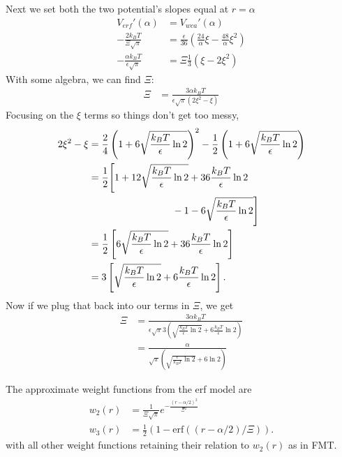 \documentclass[letterpaper,twocolumn,amsmath,amssymb,prb]{revtex4-1}
\begin{document}
Next we set both the two potential's slopes equal at $r = \alpha$
\begin{align}
  V_{erf}'(\alpha) &= V_{wca}'(\alpha) \\
  -\frac{2 k_B T}{\Xi \sqrt{\pi}} &= \frac{\epsilon}{36} \left(
  \frac{24}{\alpha} \xi - \frac{48}{\alpha} \xi^2 \right) \\
  -\frac{\alpha k_B T}{\epsilon \sqrt{\pi}} &= \Xi \frac{1}{3} \left(
  \xi - 2\xi^2 \right)
\end{align}
With some algebra, we can find $\Xi$:
\begin{align}
  \Xi &= \frac{3 \alpha k_B T}{\epsilon \sqrt{\pi} \left( 2 \xi^2 - \xi
    \right)}
\end{align}
Focusing on the $\xi$ terms so things don't get too messy,
\begin{align}
  2 \xi^2 - \xi &=  \frac{2}{4}\left(1 +
  6\sqrt{ \frac{k_BT}{\epsilon} \ln 2} \right)^2
  - \frac{1}{2}\left(1 +
  6\sqrt{ \frac{k_BT}{\epsilon} \ln 2} \right) \\
  &= \frac{1}{2}\Bigg[ 1 + 12\sqrt{ \frac{k_BT}{\epsilon}\ln 2} + 36
    \frac{k_BT}{\epsilon}\ln 2 \notag \\
    &\hspace{3cm}-1 - 6\sqrt{ \frac{k_BT}{\epsilon} \ln 2} \Bigg] \\
  &=\frac{1}{2}\left[ 6 \sqrt{ \frac{k_BT}{\epsilon} \ln 2} + 36
    \frac{k_BT}{\epsilon} \ln 2 \right] \\
  &=3\left[ \sqrt{ \frac{k_BT}{\epsilon} \ln 2} + 6
    \frac{k_BT}{\epsilon} \ln 2 \right].
\end{align}
Now if we plug that back into our terms in $\Xi$, we get
\begin{align}
  \Xi &= \frac{3 \alpha k_B T}{\epsilon \sqrt{\pi} 3\left(
      \sqrt{ \frac{k_BT}{\epsilon} \ln 2} + 6 \frac{k_BT}{\epsilon}
      \ln 2 \right) } \\
  &= \frac{\alpha}{\sqrt{\pi} \left( \sqrt{\frac{\epsilon}{k_BT} \ln
      2} + 6 \ln 2 \right)}
\end{align}

The approximate weight functions from the erf model are
\begin{align}
  w_2(r) &= \frac{1}{\Xi \sqrt{\pi}} e^{-\frac{(r-\alpha/2)^2}{\Xi^2}} \\
  w_3(r) &= \tfrac12 ( 1 - \mathrm{erf}((r-\alpha/2)/\Xi) ).
\end{align}
with all other weight functions retaining their relation to $w_2(r)$
as in FMT.
\end{document}
